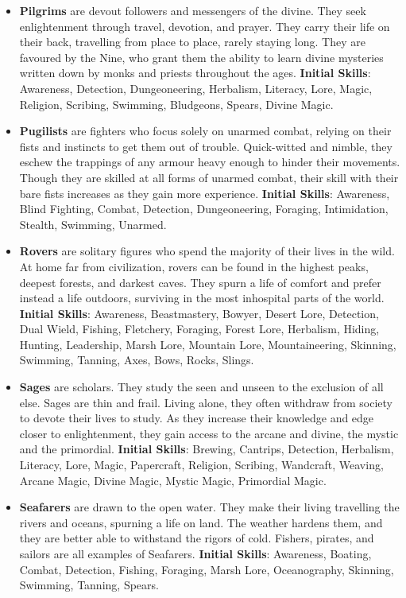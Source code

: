 \begin{itemize}
\item {\bf Pilgrims} are devout followers and messengers of the divine.  
They seek enlightenment through travel, devotion, and prayer.  They carry 
their life on their back, travelling from place to place, rarely staying 
long.  They are favoured by the Nine, who grant them the ability to learn
divine mysteries written down by monks and priests throughout the ages.
\textbf{Initial Skills}: Awareness, Detection, Dungeoneering, Herbalism,
Literacy, Lore, Magic, Religion, Scribing, Swimming, Bludgeons, Spears,
Divine Magic.

\item {\bf Pugilists} are fighters who focus solely on unarmed combat, 
relying on their fists and instincts to get them out of trouble.  
Quick-witted and nimble, they eschew the trappings of any armour heavy 
enough to hinder their movements.  Though they are skilled at all forms of
unarmed combat, their skill with their bare fists increases as they gain
more experience.  \textbf{Initial Skills}: Awareness, Blind Fighting, 
Combat, Detection, Dungeoneering, Foraging, Intimidation, Stealth, 
Swimming, Unarmed.

\item {\bf Rovers} are solitary figures who spend the majority of their 
lives in the wild.  At home far from civilization, rovers can be found in 
the highest peaks, deepest forests, and darkest caves.  They spurn a life 
of comfort and prefer instead a life outdoors, surviving in the most 
inhospital parts of the world.  \textbf{Initial Skills}: Awareness,
Beastmastery, Bowyer, Desert Lore, Detection, Dual Wield, Fishing, 
Fletchery, Foraging, Forest Lore, Herbalism, Hiding, Hunting, Leadership, 
Marsh Lore, Mountain Lore, Mountaineering, Skinning, Swimming, Tanning, 
Axes, Bows, Rocks, Slings.

\item {\bf Sages} are scholars.  They study the seen and unseen to the 
exclusion of all else.  Sages are thin and frail.  Living alone, they often
withdraw from society to devote their lives to study.  As they increase 
their knowledge and edge closer to enlightenment, they gain access to the 
arcane and divine, the mystic and the primordial.  \textbf{Initial Skills}:
Brewing, Cantrips, Detection, Herbalism, Literacy, Lore, Magic, Papercraft,
Religion, Scribing, Wandcraft, Weaving, Arcane Magic, Divine Magic, 
Mystic Magic, Primordial Magic.

\item {\bf Seafarers} are drawn to the open water.  They make their living 
travelling the rivers and oceans, spurning a life on land.  The weather 
hardens them, and they are better able to withstand the rigors of cold.  
Fishers, pirates, and sailors are all examples of Seafarers.
\textbf{Initial Skills}: Awareness, Boating, Combat, Detection, Fishing,
Foraging, Marsh Lore, Oceanography, Skinning, Swimming, Tanning, Spears.


\end{itemize}
